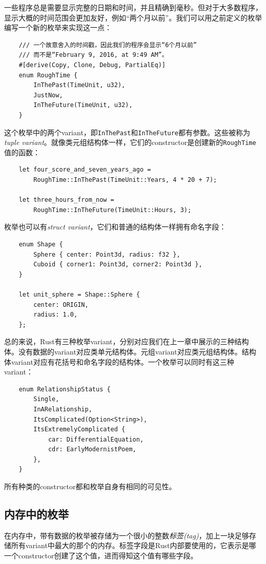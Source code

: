 一些程序总是需要显示完整的日期和时间，并且精确到毫秒。但对于大多数程序，显示大概的时间范围会更加友好，例如“两个月以前”。我们可以用之前定义的枚举编写一个新的枚举来实现这一点：
\begin{verbatim}
    /// 一个故意舍入的时间戳，因此我们的程序会显示“6个月以前”
    /// 而不是“February 9, 2016, at 9:49 AM”。
    #[derive(Copy, Clone, Debug, PartialEq)]
    enum RoughTime {
        InThePast(TimeUnit, u32),
        JustNow,
        InTheFuture(TimeUnit, u32),
    }
\end{verbatim}

这个枚举中的两个variant，即\texttt{InThePast}和\texttt{InTheFuture}都有参数。这些被称为\emph{tuple variant}。就像类元组结构体一样，它们的constructor是创建新的\texttt{RoughTime}值的函数：
\begin{verbatim}
    let four_score_and_seven_years_ago =
        RoughTime::InThePast(TimeUnit::Years, 4 * 20 + 7);

    let three_hours_from_now =
        RoughTime::InTheFuture(TimeUnit::Hours, 3);
\end{verbatim}

枚举也可以有\emph{struct variant}，它们和普通的结构体一样拥有命名字段：
\begin{verbatim}
    enum Shape {
        Sphere { center: Point3d, radius: f32 },
        Cuboid { corner1: Point3d, corner2: Point3d },
    }

    let unit_sphere = Shape::Sphere {
        center: ORIGIN,
        radius: 1.0,
    };
\end{verbatim}

总的来说，Rust有三种枚举variant，分别对应我们在上一章中展示的三种结构体。没有数据的variant对应类单元结构体。元组variant对应类元组结构体。结构体variant对应有花括号和命名字段的结构体。一个枚举可以同时有这三种variant：
\begin{verbatim}
    enum RelationshipStatus {
        Single,
        InARelationship,
        ItsComplicated(Option<String>),
        ItsExtremelyComplicated {
            car: DifferentialEquation, 
            cdr: EarlyModernistPoem,
        },
    }
\end{verbatim}

所有种类的constructor都和枚举自身有相同的可见性。

\subsection{内存中的枚举}

在内存中，带有数据的枚举被存储为一个很小的整数\emph{标签(tag)}，加上一块足够存储所有variant中最大的那个的内存。标签字段是Rust内部要使用的，它表示是哪一个constructor创建了这个值，进而得知这个值有哪些字段。

